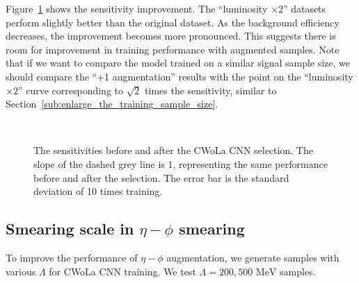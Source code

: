 \documentclass[12pt]{article}
\begin{document}
        Figure~\ref{fig:sensitivity_improvement_origin_aug_1_x2_split_val} shows the sensitivity improvement. The ``luminosity $\times 2$'' datasets perform slightly better than the original dataset. As the background efficiency decreases, the improvement becomes more pronounced. This suggests there is room for improvement in training performance with augmented samples. Note that if we want to compare the model trained on a similar signal sample size, we should compare the ``+1 augmentation'' results with the point on the ``luminosity $\times 2$'' curve corresponding to $\sqrt{2}$ times the sensitivity, similar to Section~\ref{sub:enlarge_the_training_sample_size}. 
        \begin{figure}[htpb]
            \centering
             \\
            \caption{The sensitivities before and after the CWoLa CNN selection. The slope of the dashed grey line is $1$, representing the same performance before and after the selection. The error bar is the standard deviation of 10 times training.}
            \label{fig:sensitivity_improvement_origin_aug_1_x2_split_val}
        \end{figure}
    \subsection{Smearing scale in \texorpdfstring{$\eta-\phi$}{eta-phi} smearing}%
    \label{sub:smearing_scale_in_eta_phi_smearing}
        To improve the performance of $\eta-\phi$ augmentation, we generate samples with various $\Lambda$ for CWoLa CNN training. We test $\Lambda = 200, 500 \text{ MeV}$ samples.
\end{document}
